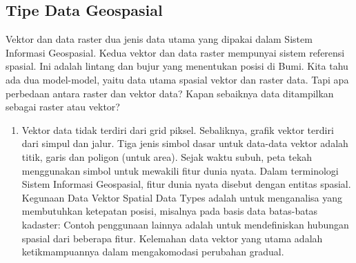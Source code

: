 \subsection{Tipe Data Geospasial}
Vektor dan data raster dua jenis data utama yang dipakai dalam Sistem Informasi Geospasial. Kedua vektor dan data raster mempunyai sistem referensi spasial. Ini adalah lintang dan bujur yang menentukan posisi di Bumi. Kita tahu ada dua model-model, yaitu data utama spasial vektor dan raster data. Tapi apa perbedaan antara raster dan vektor data? Kapan sebaiknya data ditampilkan sebagai raster atau vektor?
\begin{enumerate}
\item Vektor data tidak terdiri dari grid piksel. Sebaliknya, grafik vektor terdiri dari simpul dan jalur. Tiga jenis simbol dasar untuk data-data vektor adalah titik, garis dan poligon (untuk area). Sejak waktu subuh, peta tekah menggunakan simbol untuk mewakili fitur dunia nyata. Dalam terminologi Sistem Informasi Geospasial, fitur dunia nyata disebut dengan entitas spasial. 
Kegunaan Data Vektor Spatial Data Types adalah untuk menganalisa yang membutuhkan ketepatan posisi, misalnya pada basis data batas-batas kadaster: Contoh penggunaan lainnya adalah untuk mendefiniskan hubungan spasial dari beberapa fitur. Kelemahan data vektor yang utama adalah ketikmampuannya dalam mengakomodasi perubahan gradual. 

\end{enumerate}

